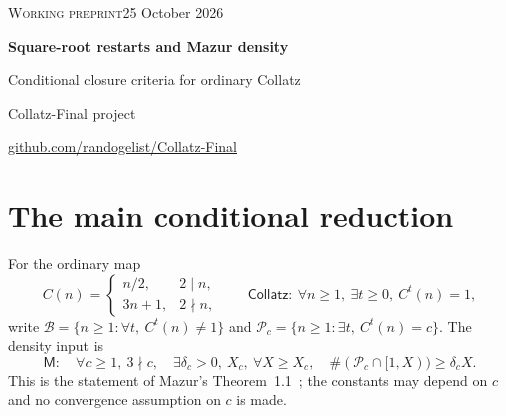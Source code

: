 \documentclass[11pt,a4paper]{article}
\theoremstyle{definition}
\newcommand{\CC}{\mathsf{Collatz}}
\newcommand{\MM}{\mathsf M}
\newcommand{\Bad}{\mathcal B}
\newcommand{\Pred}{\mathcal P}
\begin{document}
\thispagestyle{plain}
{\small\textsc{Working preprint}\hfill 25 October 2026\par}
\vspace{5mm}
{\LARGE\bfseries Square-root restarts and Mazur density\par}
\vspace{3mm}
{\large Conditional closure criteria for ordinary Collatz\par}
\vspace{4mm}
{\normalsize Collatz-Final project\par}
{\small\href{https://github.com/randogelist/Collatz-Final}{github.com/randogelist/Collatz-Final}\par}
\vspace{4mm}
\begin{abstract}
We reconstruct three conditional closure criteria from the supplied dagger--Mazur
Lean developments. Square-root restarts partition hypothetical bad starts into
terminal fibres and failure-depth layers. A direct estimate for each fixed
predecessor basin shows that cofinal smallness of the maximal layer mass forces
zero lower harmonic density of that basin. Mazur's fixed-target positive
predecessor-density theorem then yields Collatz. A second route uses existence
of the harmonic density of each fixed terminal fibre; geometric gaps force
every such limit to vanish. A synchronized weighted aggregate gives a third
formulation. The analytic smallness and regularity conditions remain open.
We distinguish source-level proofs, a supplied historical native log, and the
external density theorem retained as an axiom in one Lean package.
\end{abstract}

\section{The main conditional reduction}
For the ordinary map
\[
 C(n)=
 \begin{cases}n/2,&2\mid n,\\3n+1,&2\nmid n,\end{cases}
 \qquad
 \CC:\ \forall n\ge1,\ \exists t\ge0,\ C^t(n)=1,
\]
write $\Bad=\{n\ge1:\forall t,\ C^t(n)\ne1\}$ and
$\Pred_c=\{n\ge1:\exists t,\ C^t(n)=c\}$. The density input is
\[
 \MM:\quad
 \forall c\ge1,\ 3\nmid c,\quad
 \exists\delta_c>0,\ X_c,\ \forall X\ge X_c,\quad
 \#(\Pred_c\cap[1,X))\ge\delta_c X.
 \tag{M}
\]
This is the statement of Mazur's Theorem~1.1~\cite{mazur}; the constants
may depend on $c$ and no convergence assumption on $c$ is made.
\end{document}
